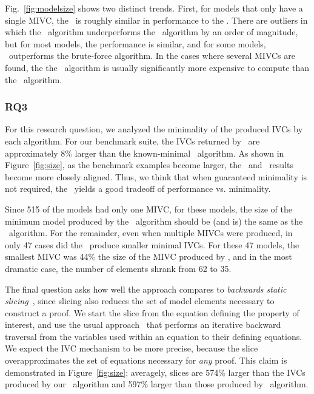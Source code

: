 Fig.~\ref{fig:modelsize} shows two distinct trends.  First, for models that only have a single MIVC, the \aivcalg\ is roughly similar in performance to the \ucbfalg.  There are outliers in which the \aivcalg\ algorithm underperforms the \ucbfalg\ algorithm by an order of magnitude, but for most models, the performance is similar, and for some models, \aivcalg\ outperforms the brute-force algorithm.
In the cases where several MIVCs are found, the the \aivcalg\ algorithm is usually significantly more expensive to compute than the \ucbfalg\ algorithm.  



\subsubsection{RQ3}
For this research question, we analyzed the minimality of the produced IVCs by each algorithm.  For our benchmark suite, the IVCs returned by \ucalg\ are approximately 8\% larger than the known-minimal \ucbfalg\ algorithm.  As shown in Figure~\ref{fig:size}, as the benchmark examples become larger, the \ucalg\ and \ucbfalg\ results become more closely aligned.  Thus, we think that when guaranteed minimality is not required, the \ucalg\ yields a good tradeoff of performance vs. minimality.

Since 515 of the models had only one MIVC, for these models, the size of the minimum model produced by the \aivcalg\ algorithm should be (and is) the same as the \ucbfalg\ algorithm.  For the remainder, even when multiple MIVCs were produced, in only 47 cases did the \aivcalg\ produce smaller minimal IVCs.  For these 47 models, the smallest MIVC was 44\% the size of the MIVC produced by \ucbfalg, and in the most dramatic case, the number of elements shrank from 62 to 35. %

The final question asks how well the approach compares to {\em backwards static slicing}~\cite{Tip95asurvey}, since slicing also reduces the set of model elements necessary to construct a proof.  We start the slice from the equation defining the property of interest, and use the usual approach~\cite{Gaucher03:slicing} that performs an iterative backward traversal from the variables used within an equation to their defining equations.  We expect the IVC mechanism to be more precise, because the slice overapproximates the set of equations necessary for {\em any} proof.  This claim is demonstrated in Figure~\ref{fig:size}; averagely, slices are 574\% larger than the IVCs produced by our \ucalg\ algorithm and 597\% larger than those produced by \ucbfalg\ algorithm.

